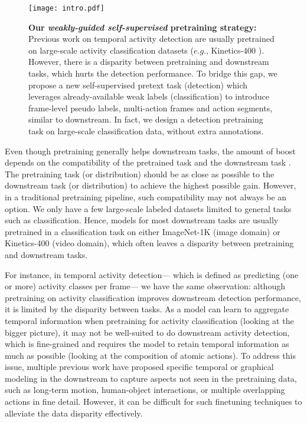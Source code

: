 \documentclass[letterpaper]{article} \usepackage{aaai23}  \usepackage{times}  \usepackage{helvet}  \usepackage{courier}  \usepackage[hyphens]{url}  \usepackage{graphicx} \urlstyle{rm} \def\UrlFont{\rm}  \usepackage{natbib}  \usepackage{caption} \frenchspacing  \setlength{\pdfpagewidth}{8.5in}  \setlength{\pdfpageheight}{11in}  \usepackage{algorithm}
\newcommand{\ch}{}
\begin{document}
\begin{figure}[t]
	\centering
	\texttt{[image: intro.pdf]}
	\caption{\textbf{Our \ch{\textit{weakly-guided self-supervised}} pretraining strategy:} Previous work on temporal activity detection are usually pretrained on large-scale activity classification datasets ($e.g.$, Kinetics-400 \cite{carreira2017quo}). However, there is a disparity between pretraining and downstream tasks, which hurts the detection performance. \ch{To bridge this gap, we propose a new self-supervised pretext task (detection) which leverages already-available weak labels (classification) to introduce frame-level pseudo labels, multi-action frames and action segments, similar to downstream. In fact, we design a detection pretraining task on large-scale classification data, without extra annotations.} }
	\label{fig:intro}
\end{figure}

Even though pretraining generally helps downstream tasks, the amount of boost depends on the compatibility of the pretrained task and the downstream task \cite{abnar2021exploring}. The pretraining task (or distribution) should be as close as possible to the downstream task (or distribution) to achieve the highest possible gain. However, in a traditional pretraining pipeline, such compatibility may not always be an option. We only have a few large-scale labeled datasets limited to general tasks such as classification. Hence, models for most downstream tasks are usually pretrained in a classification task on either ImageNet-1K \cite{deng2009imagenet} (image domain) or Kinetics-400 \cite{carreira2017quo} (video domain), which often leaves a disparity between pretraining and downstream tasks. 


For instance, in temporal activity detection--- which is defined as predicting (one or more) activity classes per frame--- we have the same observation: although pretraining on activity classification improves downstream detection performance, it is limited by the disparity between tasks. As a model can learn to aggregate temporal information when pretraining for activity classification (looking at the bigger picture), it may not be well-suited to do downstream activity detection, which is fine-grained and requires the model to retain temporal information as much as possible (looking at the composition of atomic actions). 
To address this issue, multiple previous work have proposed specific temporal \cite{piergiovanni2018learning, piergiovanni2019temporal, kahatapitiya2021coarse} or graphical \cite{ghosh2020stacked, mavroudi2020representation} modeling in the downstream to capture aspects not seen in the pretraining data, such as long-term motion, human-object interactions, or multiple overlapping actions in fine detail. However, it can be difficult for such finetuning techniques to alleviate the data disparity effectively. 
\end{document}
